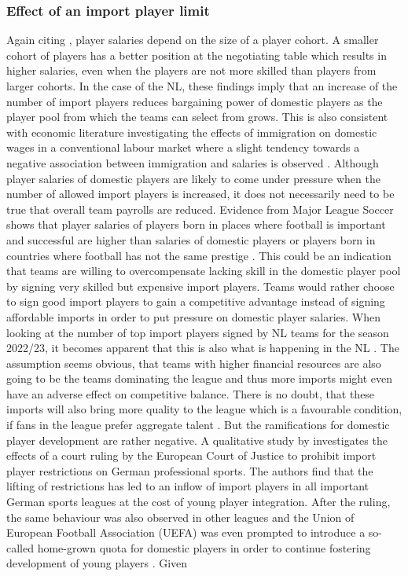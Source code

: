 \documentclass[12pt, a4paper]{article}
\begin{document}
\subsubsection{Effect of an import player limit}

Again citing \citet{bryson_all-star_2017}, player salaries depend on the size of a player cohort. A smaller cohort of players has a better position at the negotiating table which results in higher salaries, even when the players are not more skilled than players from larger cohorts. In the case of the NL, these findings imply that an increase of the number of import players reduces bargaining power of domestic players as the player pool from which the teams can select from grows. This is also consistent with economic literature investigating the effects of immigration on domestic wages in a conventional labour market where a slight tendency towards a negative association between immigration and salaries is observed \citep[see][]{longhi_meta-analytic_2005,llull_effect_2018}. Although player salaries of domestic players are likely to come under pressure when the number of allowed import players is increased, it does not necessarily need to be true that overall team payrolls are reduced. Evidence from Major League Soccer shows that player salaries of players born in places where football is important and successful are higher than salaries of domestic players or players born in countries where football has not the same prestige \citep{celik_salary_2017}. This could be an indication that teams are willing to overcompensate lacking skill in the domestic player pool by signing very skilled but expensive import players. Teams would rather choose to sign good import players to gain a competitive advantage instead of signing affordable imports in order to put pressure on domestic player salaries. When looking at the number of top import players signed by NL teams for the season 2022/23, it becomes apparent that this is also what is happening in the NL \citep[see][]{burgler_geldprobleme_2022}. The assumption seems obvious, that teams with higher financial resources are also going to be the teams dominating the league and thus more imports might even have an adverse effect on competitive balance. There is no doubt, that these imports will also bring more quality to the league which is a favourable condition, if fans in the league prefer aggregate talent \citep[see][]{dietl_effect_2009,dietl_effect_2010}. But the ramifications for domestic player development are rather negative. A qualitative study by \citet{cachay_bosman-urteil_2001} investigates the effects of a court ruling by the European Court of Justice to prohibit import player restrictions on German professional sports. The authors find that the lifting of restrictions has led to an inflow of import players in all important German sports leagues at the cost of young player integration. After the ruling, the same behaviour was also observed in other leagues and the Union of European Football Association (UEFA) was even prompted to introduce a so-called home-grown quota for domestic players in order to continue fostering development of young players \citep{bullough_measuring_2019}. Given 
\end{document}
